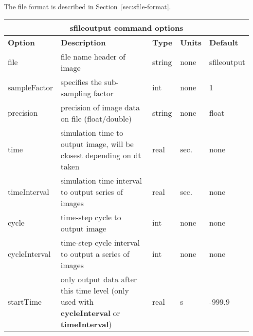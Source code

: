 \documentclass[11pt]{report}
\begin{document}
The file format is described in Section~\ref{sec:sfile-format}.
%
\begin{center}
\begin{tabular}{|l|p{8cm}|l|l|l|} \hline
\multicolumn{5}{|c|}{\bf sfileoutput command options}\\ \hline
{\bf Option} & {\bf Description}          & {\bf Type} & {\bf Units} & {\bf Default} \\ \hline 
\hline
file        & file name header of image                          & string & none & sfileoutput \\ \hline
sampleFactor  & specifies the sub-sampling factor & int & none & 1 \\  \hline
precision   & precision of image data on file (float/double)     & string & none & float \\ \hline
time          & simulation time to output image, will be closest depending on dt taken & real  & sec.  & none \\ \hline
timeInterval  & simulation time interval to output series of images                    & real  & sec.  & none \\ \hline
cycle         & time-step cycle to output image                                        & int   & none  & none \\ \hline
cycleInterval & time-step cycle interval to output a series of images                  & int   & none & none \\ \hline
startTime     & only output data after this time level (only used with {\bf cycleInterval} or {\bf
 timeInterval}) & real & s & -999.9 \\ \hline 
\end{tabular}
\end{center}
%

\end{document}
